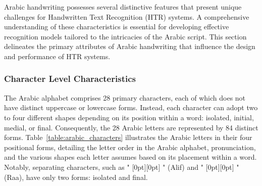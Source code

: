 \documentclass[conference]{IEEEtran}
\newcommand{\artext}[1]{%
  {\fontsize{8pt}{11pt}\selectfont \raisebox{0pt}[0pt][0pt]{\RL{#1}}}%
}
\begin{document}
Arabic handwriting possesses several distinctive features that present unique challenges for Handwritten Text Recognition (HTR) systems. A comprehensive understanding of these characteristics is essential for developing effective recognition models tailored to the intricacies of the Arabic script. This section delineates the primary attributes of Arabic handwriting that influence the design and performance of HTR systems.

\subsubsection{Character Level Characteristics}

The Arabic alphabet comprises 28 primary characters, each of which does not have distinct uppercase or lowercase forms. Instead, each character can adopt two to four different shapes depending on its position within a word: isolated, initial, medial, or final. Consequently, the 28 Arabic letters are represented by 84 distinct forms. Table~\ref{table:arabic_characters} illustrates the Arabic letters in their four positional forms, detailing the letter order in the Arabic alphabet, pronunciation, and the various shapes each letter assumes based on its placement within a word. Notably, separating characters, such as "\artext{ا}" (Alif) and "\artext{ر}" (Raa), have only two forms: isolated and final.
\end{document}
